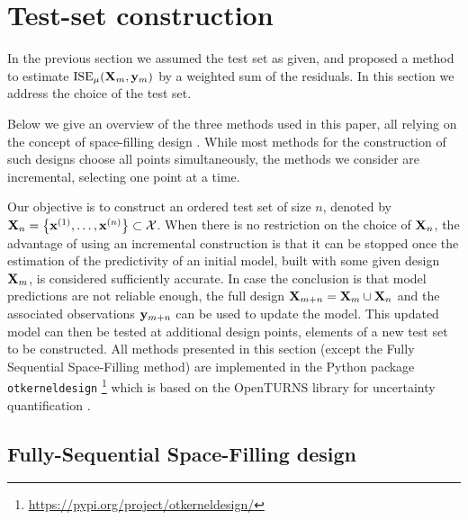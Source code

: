 \section{Test-set construction}

In the previous section we assumed  the test set as given, and proposed a method to estimate $\mathrm{ISE}_\mu({\bf X}_m,{\bf y}_m)$ by a weighted sum of the residuals. In this section we address the choice of the test set.

Below we give an overview of the three methods used in this paper, all relying on the concept of space-filling design \cite{fanli06, promul12}. While most methods for the construction of such designs choose all points simultaneously, the methods we consider are incremental, selecting one point at a time.
 
Our objective is to construct an ordered test set of size $n$, denoted by ${\bf X}_n=\left\{{\bf x}^{(1)},\ldots,{\bf x}^{(n)}\right\}\subset\mathcal{X}$. When there is no restriction on the choice of ${\bf X}_n$, the advantage of using an incremental construction is that it can be stopped once the estimation of the predictivity of an initial model, built with some given design ${\bf X}_m$, is considered sufficiently accurate. In case the conclusion is that model predictions are not reliable enough, the full design ${\bf X}_{m+n}={\bf X}_m\cup{\bf X}_n$ and the associated observations ${\bf y}_{m+n}$ can be used to update the model. 
This updated model can then be tested at additional design points, elements of a new test set to be constructed. All methods presented in this section (except the Fully Sequential Space-Filling method) are implemented in the Python package \texttt{otkerneldesign} \footnote{\url{https://pypi.org/project/otkerneldesign/}} which is based on the OpenTURNS library for uncertainty quantification \cite{baudut17}.

\subsection{Fully-Sequential Space-Filling design}\label{S:FSSF}

